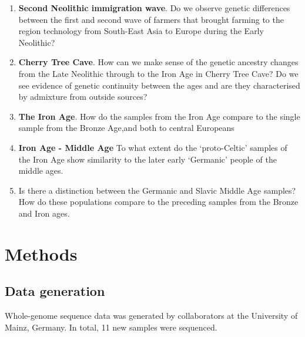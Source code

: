 \begin{enumerate}
\item \textbf{Second Neolithic immigration wave}. Do we observe genetic differences between the first and second wave of farmers that brought farming to the region technology from South-East Asia to Europe during the Early Neolithic?
\item \textbf{Cherry Tree Cave}. How can we make sense of the genetic ancestry changes from the Late Neolithic through to the Iron Age in Cherry Tree Cave? Do we see evidence of genetic continuity between the ages and are they characterised by admixture from outside sources?
\item \textbf{The Iron Age}. How do the samples from the Iron Age compare to the single sample from the Bronze Age,and both to central Europeans
\item \textbf{Iron Age - Middle Age} To what extent do the `proto-Celtic' samples of the Iron Age show similarity to the later early `Germanic' people of the middle ages.  
\item Is there a distinction between the Germanic and Slavic Middle Age samples? How do these populations compare to the preceding samples from the Bronze and Iron ages. 
\end{enumerate}

\section{Methods}

\subsection{Data generation}

Whole-genome sequence data was generated by collaborators at the University of Mainz, Germany. In total, 11 new samples were sequenced. 

